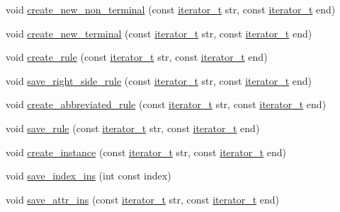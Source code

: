 \begin{CompactItemize}
\item 
void \hyperlink{namespacegenevalmag_6d8584e0b692b4a20384e0742b22630a}{create\_\-new\_\-non\_\-terminal} (const \hyperlink{namespacegenevalmag_64946721fb97e58be670a468bf8e7056}{iterator\_\-t} str, const \hyperlink{namespacegenevalmag_64946721fb97e58be670a468bf8e7056}{iterator\_\-t} end)
\item 
void \hyperlink{namespacegenevalmag_3ab01d2c2dc547707d49394c59211460}{create\_\-new\_\-terminal} (const \hyperlink{namespacegenevalmag_64946721fb97e58be670a468bf8e7056}{iterator\_\-t} str, const \hyperlink{namespacegenevalmag_64946721fb97e58be670a468bf8e7056}{iterator\_\-t} end)
\item 
void \hyperlink{namespacegenevalmag_38a9e6cd331b8e5caad524d12229d71e}{create\_\-rule} (const \hyperlink{namespacegenevalmag_64946721fb97e58be670a468bf8e7056}{iterator\_\-t} str, const \hyperlink{namespacegenevalmag_64946721fb97e58be670a468bf8e7056}{iterator\_\-t} end)
\item 
void \hyperlink{namespacegenevalmag_b3b5ed3e86e091b48713f1e3a0065d9c}{save\_\-right\_\-side\_\-rule} (const \hyperlink{namespacegenevalmag_64946721fb97e58be670a468bf8e7056}{iterator\_\-t} str, const \hyperlink{namespacegenevalmag_64946721fb97e58be670a468bf8e7056}{iterator\_\-t} end)
\item 
void \hyperlink{namespacegenevalmag_bd826b7a45bf0c29f45dc8f8c64c0805}{create\_\-abbreviated\_\-rule} (const \hyperlink{namespacegenevalmag_64946721fb97e58be670a468bf8e7056}{iterator\_\-t} str, const \hyperlink{namespacegenevalmag_64946721fb97e58be670a468bf8e7056}{iterator\_\-t} end)
\item 
void \hyperlink{namespacegenevalmag_b100c06acfd394415ddcf909a5c9490f}{save\_\-rule} (const \hyperlink{namespacegenevalmag_64946721fb97e58be670a468bf8e7056}{iterator\_\-t} str, const \hyperlink{namespacegenevalmag_64946721fb97e58be670a468bf8e7056}{iterator\_\-t} end)
\item 
void \hyperlink{namespacegenevalmag_61de26b3fdfcf0998039df573a3ec6f0}{create\_\-instance} (const \hyperlink{namespacegenevalmag_64946721fb97e58be670a468bf8e7056}{iterator\_\-t} str, const \hyperlink{namespacegenevalmag_64946721fb97e58be670a468bf8e7056}{iterator\_\-t} end)
\item 
void \hyperlink{namespacegenevalmag_8f0dbc1c191c7c3e357c9930692e180e}{save\_\-index\_\-ins} (int const index)
\item 
void \hyperlink{namespacegenevalmag_741fa074f83ccbe1fc90a53eb3635ba8}{save\_\-attr\_\-ins} (const \hyperlink{namespacegenevalmag_64946721fb97e58be670a468bf8e7056}{iterator\_\-t} str, const \hyperlink{namespacegenevalmag_64946721fb97e58be670a468bf8e7056}{iterator\_\-t} end)

\end{CompactItemize}
